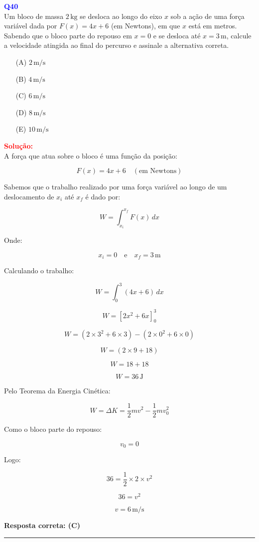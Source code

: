 \documentclass[a4paper,12pt]{article}
\newcommand{\printingbibliography}{%

    \pagestyle{myheadings}
    \markright{}
    \sloppy
    \printbibliography[heading=bibintoc, %
                   title=Refer\^encias %
                  ]
    \fussy%
}
\begin{document}
\begin{flushleft}
\textbf{\textcolor{blue}{\Large Q40}}\\

Um bloco de massa $2\,\text{kg}$ se desloca ao longo do eixo $x$ sob a ação de uma força variável dada por 
$F(x) = 4x + 6$ (em Newtons), em que $x$ está em metros. Sabendo que o bloco parte do repouso em $x = 0$ e se 
desloca até $x = 3\,\text{m}$, calcule a velocidade atingida ao final do percurso e assinale a alternativa correta.

\begin{enumerate}
\item[(A)] $2\,\text{m/s}$
\item[(B)] $4\,\text{m/s}$
\item[(C)] $6\,\text{m/s}$
\item[(D)] $8\,\text{m/s}$
\item[(E)] $10\,\text{m/s}$
\end{enumerate}

\vspace{0.5cm}

\textcolor{red}{\textbf{Solução:}}\\

A força que atua sobre o bloco é uma função da posição:

\[
F(x) = 4x + 6 \quad (\text{em Newtons})
\]

Sabemos que o trabalho realizado por uma força variável ao longo de um deslocamento de $x_i$ até $x_f$ é dado por:

\[
W = \int_{x_i}^{x_f} F(x) \, dx
\]

Onde:

\[
x_i = 0 \quad \text{e} \quad x_f = 3\,\text{m}
\]

Calculando o trabalho:

\[
W = \int_{0}^{3} (4x + 6) \, dx
\]

\[
W = \left[ 2x^2 + 6x \right]_0^3
\]

\[
W = \left( 2 \times 3^2 + 6 \times 3 \right) - \left( 2 \times 0^2 + 6 \times 0 \right)
\]

\[
W = \left( 2 \times 9 + 18 \right)
\]

\[
W = 18 + 18
\]

\[
W = 36\,\text{J}
\]

Pelo Teorema da Energia Cinética:

\[
W = \Delta K = \frac{1}{2} m v^2 - \frac{1}{2} m v_0^2
\]

Como o bloco parte do repouso:

\[
v_0 = 0
\]

Logo:

\[
36 = \frac{1}{2} \times 2 \times v^2
\]

\[
36 = v^2
\]

\[
v = 6\,\text{m/s}
\]

\textbf{Resposta correta: \colorbox{green!50}{(C)}}

\end{flushleft}
\noindent\rule{\linewidth}{0.6pt}\\

\end{document}
